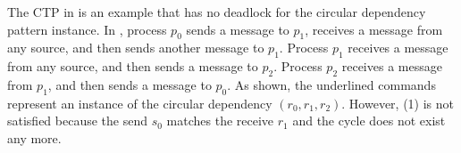 The CTP in  is an example that has no deadlock for the circular dependency pattern instance. In , process $p_0$ sends a message to $p_1$, receives a message from any source, and then sends another message to $p_1$. Process $p_1$ receives a message from any source, and then sends a message to $p_2$. Process $p_2$ receives a message from $p_1$, and then sends a message to $p_0$. As shown, the underlined commands represent an instance of the circular dependency $(r_0,r_1,r_2)$. However, (1) is not satisfied because the send $s_0$ matches the receive $r_1$ and the cycle does not exist any more. 

